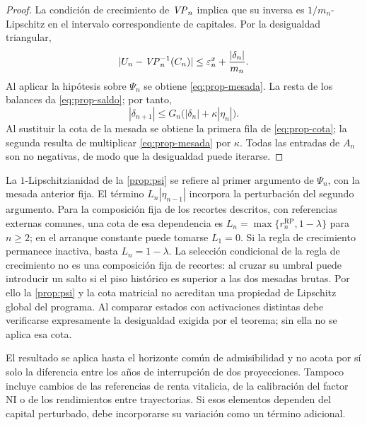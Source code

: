 \begin{proof}
La condición de crecimiento de $\mathit{VP}_n$ implica que su inversa es
$1/m_n$-Lipschitz en el intervalo correspondiente de capitales. Por la
desigualdad triangular,
\[
 |U_n-\mathit{VP}_n^{-1}(C_n)|
 \le\varepsilon_n^x+\frac{|\delta_n|}{m_n}.
\]
Al aplicar la hipótesis sobre $\Psi_n$ se obtiene
\cref{eq:prop-mesada}. La resta de los balances da
\cref{eq:prop-saldo}; por tanto,
\[
 |\delta_{n+1}|\le G_n\bigl(|\delta_n|+\kappa|\eta_n|\bigr).
\]
Al sustituir la cota de la mesada se obtiene la primera fila de
\cref{eq:prop-cota}; la segunda resulta de multiplicar
\cref{eq:prop-mesada} por $\kappa$. Todas las entradas de $A_n$ son no
negativas, de modo que la desigualdad puede iterarse.
\end{proof}

\begin{remark}
La $1$-Lipschitzianidad de la \cref{prop:psi} se refiere al primer
argumento de $\Psi_n$, con la mesada anterior fija. El término
$L_n|\eta_{n-1}|$ incorpora la perturbación del segundo argumento.
Para la composición fija de los recortes descritos, con referencias
externas comunes, una cota de esa dependencia es
$L_n=\max\{r_n^{\mathrm{RP}},1-\lambda\}$ para $n\ge2$; en el
arranque constante puede tomarse $L_1=0$. Si la regla de crecimiento
permanece inactiva, basta $L_n=1-\lambda$.
La selección condicional de la regla de crecimiento no es una composición
fija de recortes: al cruzar su umbral puede introducir un salto si el piso
histórico es superior a las dos mesadas brutas. Por ello la
\cref{prop:psi} y la cota matricial no acreditan una propiedad de
Lipschitz global del programa. Al comparar estados con activaciones
distintas debe verificarse expresamente la desigualdad exigida por el
teorema; sin ella no se aplica esa cota.

El resultado se aplica hasta el horizonte común de admisibilidad y no
acota por sí solo la diferencia entre los años de interrupción de dos
proyecciones. Tampoco incluye cambios de las referencias de renta vitalicia,
de la calibración del factor NI o de los rendimientos entre trayectorias.
Si esos elementos dependen del capital perturbado, debe incorporarse
su variación como un término adicional.
\end{remark}

